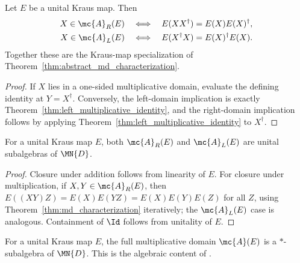 \begin{theorem}
    \label{thm:md_characterization}
    \leanok
    Let $E$ be a unital Kraus map. Then
    \begin{align}
        X\in\mc{A}_R(E)
         & \quad\Longleftrightarrow\quad
        E(XX^\dagger)=E(X)E(X)^\dagger, \notag \\
        X\in\mc{A}_L(E)
         & \quad\Longleftrightarrow\quad
        E(X^\dagger X)=E(X)^\dagger E(X).
        \notag
    \end{align}
    Together these are the Kraus-map specialization of
    Theorem~\ref{thm:abstract_md_characterization}.
\end{theorem}

\begin{proof}
    \leanok
    If $X$ lies in a one-sided multiplicative domain, evaluate the defining
    identity at $Y=X^\dagger$.
    Conversely, the left-domain implication is exactly
    Theorem~\ref{thm:left_multiplicative_identity}, and the right-domain
    implication follows by applying
    Theorem~\ref{thm:left_multiplicative_identity} to $X^\dagger$.
\end{proof}

\begin{theorem}
    \label{thm:one_sided_md_subalgebras}
    \leanok
    For a unital Kraus map $E$, both $\mc{A}_R(E)$ and $\mc{A}_L(E)$ are
    unital subalgebras of $\MN{D}$.
\end{theorem}

\begin{proof}
    \leanok
    Closure under addition follows from linearity of $E$.
    For closure under multiplication, if $X,Y\in\mc{A}_R(E)$, then
    $E((XY)Z)=E(X)E(YZ)=E(X)E(Y)E(Z)$ for all $Z$, using
    Theorem~\ref{thm:md_characterization} iteratively; the
    $\mc{A}_L(E)$ case is analogous.
    Containment of $\Id$ follows from unitality of $E$.
\end{proof}

\begin{theorem}
    \label{thm:md_star_subalgebra}
    \leanok
    For a unital Kraus map $E$, the full multiplicative domain $\mc{A}(E)$ is
    a $*$-subalgebra of $\MN{D}$.
    This is the algebraic content of \cite[Theorem~5.7]{Wolf2012Quantum}.
\end{theorem}

